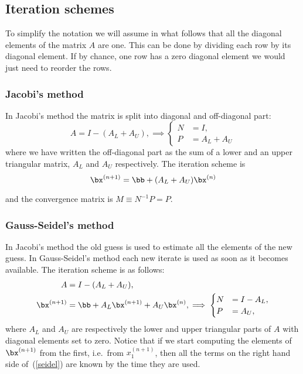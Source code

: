 \subsection{Iteration schemes}

To simplify the notation we will assume in what follows that all the
diagonal elements of the matrix $A$ are one.   This can be done by
dividing each row by its diagonal element.   If by chance, one row has
a zero diagonal element we would just need to reorder the rows.

\subsubsection{Jacobi's method}

In Jacobi's method the matrix is split into diagonal and off-diagonal
part:
%
\begin{equation*}
  A = I - ( A_L + A_U ) , \implies
  \begin{cases}
    N &= I , \\ P &= A_L+A_U
  \end{cases}
\end{equation*}
%
where we have written the off-diagonal part as the sum of a lower and
an upper triangular matrix, $A_L$ and $A_U$ respectively.   The iteration
scheme is
%
\begin{equation*}
  \bx^{(n+1)} = \bb + ( A_L + A_U ) \bx^{(n)}  
\end{equation*}

%
and the convergence matrix is $M \equiv N^{-1} P = P$.

\subsubsection{Gauss-Seidel's method}

In Jacobi's method the old guess is used to estimate all the
elements of the new guess.   In Gauss-Seidel's method each new iterate
is used as soon as it becomes available.    The iteration scheme is as
follows:
%
\begin{align}
  A &= I - (A_L+A_U) , \nonumber \\
  \bx^{(n+1)} &= \bb + A_L \bx^{(n+1)} + A_U \bx^{(n)} , \implies
  \begin{cases}
    N &= I - A_L , \\ P &= A_U ,
  \end{cases}
  \label{seidel}
\end{align}
%
where $A_L$ and $A_U$ are respectively the  lower and upper triangular
parts of $A$ with diagonal elements  set to zero.   Notice that if we
start computing  the   elements   of $\bx^{(n+1)}$ from     the first,
i.e.\ from  $x_1^{(n+1)}$, then all the  terms  on the  right hand side
of~(\ref{seidel}) are known by the time they are used.

